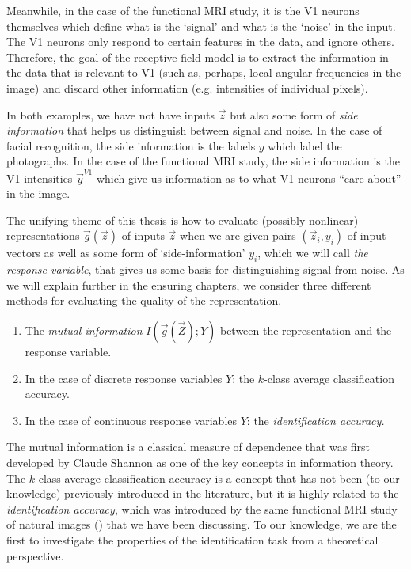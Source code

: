 Meanwhile, in the case of the functional MRI study, it is the V1
neurons themselves which define what is the `signal' and what is the
`noise' in the input.  The V1 neurons only respond to certain features
in the data, and ignore others.  Therefore, the goal of the receptive
field model is to extract the information in the data that is relevant
to V1 (such as, perhaps, local angular frequencies in the image) and
discard other information (e.g. intensities of individual pixels).

In both examples, we have not have inputs $\vec{z}$ but also some form
of \emph{side information} that helps us distinguish between signal
and noise.  In the case of facial recognition, the side information is
the labels $y$ which label the photographs.  In the case of the
functional MRI study, the side information is the V1 intensities
$\vec{y}^{V1}$ which give us information as to what V1 neurons ``care
about'' in the image.

The unifying theme of this thesis is how to evaluate (possibly
nonlinear) representations $\vec{g}(\vec{z})$ of inputs $\vec{z}$ when
we are given pairs $(\vec{z}_i, y_i)$ of input vectors as well as some
form of `side-information' $y_i$, which we will call \emph{the
  response variable}, that gives us some basis for distinguishing
signal from noise.  As we will explain further in the ensuring
chapters, we consider three different methods for evaluating the
quality of the representation.

\begin{enumerate}
\item The \emph{mutual information} $I(\vec{g}(\vec{Z}); Y)$ between the representation
and the response variable.
\item In the case of discrete response variables $Y$: 
the $k$-class average classification accuracy.
\item In the case of continuous response variables $Y$:
the \emph{identification accuracy.}
\end{enumerate}

The mutual information is a classical measure of dependence that was
first developed by Claude Shannon as one of the key concepts in
information theory.  The $k$-class average classification accuracy is
a concept that has not been (to our knowledge) previously introduced
in the literature, but it is highly related to the
\emph{identification accuracy}, which was introduced by the same
functional MRI study of natural images (\cite{Kay2008a}) that we have
been discussing.  To our knowledge, we are the first to investigate
the properties of the identification task from a theoretical
perspective.

